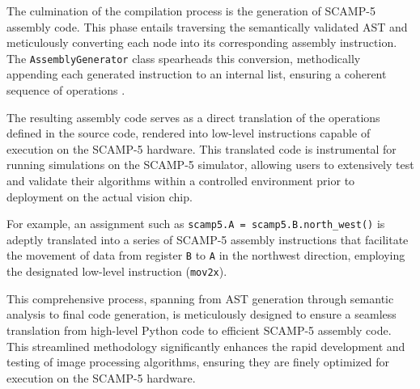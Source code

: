 The culmination of the compilation process is the generation of SCAMP-5 assembly code. This phase entails traversing the semantically validated AST and meticulously converting each node into its corresponding assembly instruction. The \texttt{AssemblyGenerator} class spearheads this conversion, methodically appending each generated instruction to an internal list, ensuring a coherent sequence of operations \cite{cooper2012engineering}.

The resulting assembly code serves as a direct translation of the operations defined in the source code, rendered into low-level instructions capable of execution on the SCAMP-5 hardware. This translated code is instrumental for running simulations on the SCAMP-5 simulator, allowing users to extensively test and validate their algorithms within a controlled environment prior to deployment on the actual vision chip.

For example, an assignment such as \texttt{scamp5.A = scamp5.B.north\_west()} is adeptly translated into a series of SCAMP-5 assembly instructions that facilitate the movement of data from register \texttt{B} to \texttt{A} in the northwest direction, employing the designated low-level instruction (\texttt{mov2x}).

This comprehensive process, spanning from AST generation through semantic analysis to final code generation, is meticulously designed to ensure a seamless translation from high-level Python code to efficient SCAMP-5 assembly code. This streamlined methodology significantly enhances the rapid development and testing of image processing algorithms, ensuring they are finely optimized for execution on the SCAMP-5 hardware.
